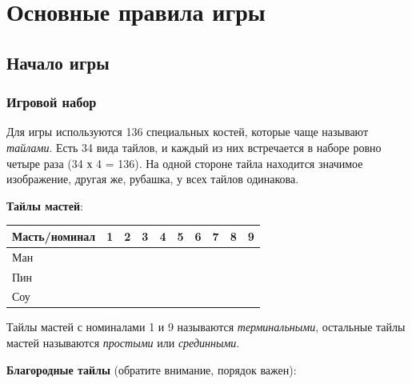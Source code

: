 \section{Основные правила игры}

\subsection{Начало игры}

\subsubsection{Игровой набор}

Для игры используются 136 специальных костей, которые чаще называют \textit{тайлами}. Есть 34 вида тайлов, и каждый из них встречается в наборе ровно четыре раза (34 х 4 = 136). На одной стороне тайла находится значимое изображение, другая же, рубашка, у всех тайлов одинакова.

\textbf{Тайлы мастей}:

\noindent\begin{tabular}{ C{3.5cm}ccccccccc }
	\toprule
	Масть/номинал & 1 & 2 & 3 & 4 & 5 & 6 & 7 & 8 & 9 \\
	\midrule
	Ман \newline &  &  &  &  &  &  &  &  &  \rule[1ex]{0pt}{7ex} \\
	\midrule
	Пин \newline &  &  &  &  &  &  &  &  &  \rule[1ex]{0pt}{7ex} \\
	\midrule
	Соу \newline &  &  &  &  &  &  &  &  &  \rule[1ex]{0pt}{7ex} \\
	\bottomrule
\end{tabular}

Тайлы мастей с номиналами 1 и 9 называются \textit{терминальными}, остальные тайлы мастей называются \textit{простыми} или \textit{срединными}.
\vspace{1cm}

\textbf{Благородные тайлы} (обратите внимание, порядок важен):


